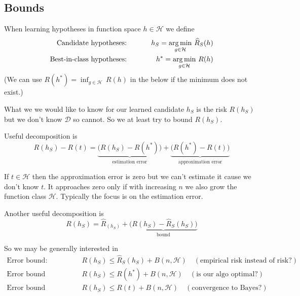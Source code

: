 \subsection{Bounds}
When learning hypotheses in function space $h \in \mathcal{H}$ we define
\begin{eqnarray}
\text{Candidate hypotheses: } & \qquad & h_S = \operatorname*{arg\,min}_{g \in \mathcal{H}} \, \widehat{R}_S(h)\\
\text{Best-in-class hypotheses: } & \qquad & h^* = \operatorname*{arg\,min}_{g \in \mathcal{H}} \, R(h)
\end{eqnarray}
(We can use $R(h^*) = \inf_{g \in \mathcal{H}} \, R(h)$ in the below if the minimum does not exist.)

What we we would like to know for our learned candidate $h_S$ is the risk $R(h_S)$ but we don't know $\mathcal{D}$ so cannot.
So we at least try to bound $R(h_S)$.

Useful decomposition is
\begin{equation}
R(h_S) - R(t) = \underbrace{\Big( R(h_S) - R(h^*) \Big)}_{\text{estimation error}} + \underbrace{\Big( R(h^*) - R(t) \Big)}_{\text{approximation error}}
\end{equation}

If $t \in \mathcal{H}$ then the approximation error is zero but we can't estimate it cause we don't know $t$. It approaches zero only if with increasing $n$ we also grow the function class $\mathcal{H}$.
Typically the focus is on the estimation error.

Another useful decomposition is
\begin{equation}
R(h_S) = \widehat{R}_(h_S) + \underbrace{\Big(R(h_S) - \widehat{R}_S(h_S) \Big)}_{\text{bound}}
\end{equation}

So we may be generally interested in
\begin{eqnarray}
\text{Error bound: } & \quad & R(h_S) \leq \widehat{R}_S(h_S) + B(n,\mathcal{H})
\quad (\text{empirical risk instead of risk?})\\
\text{Error bound relative to best-in-class: } & \quad & R(h_S) \leq R(h^*) + B(n,\mathcal{H})
\quad (\text{is our algo optimal?}) \\
\text{Error bound relative to Bayes: } & \quad & R(h_S) \leq R(t) + B(n,\mathcal{H})
\quad (\text{convergence to Bayes?}) 
\end{eqnarray}


